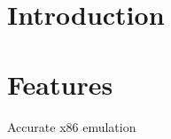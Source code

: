 \hypertarget{index_i}{}\section{Introduction}\label{index_i}
\hypertarget{index_f}{}\section{Features}\label{index_f}
\begin{DoxyItemize}
\item Accurate x86 emulation \end{DoxyItemize}
